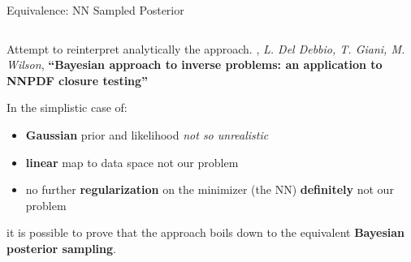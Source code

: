 \documentclass[9pt]{beamer}
\begin{document}
\begin{frame}{Equivalence: NN Sampled Posterior}
    \vspace*{15pt}

    \begin{columns}
        \begin{column}{0.5\textwidth}
            \vspace*{10pt}
            Attempt to reinterpret analytically the \nnpdf{} approach.\newline
            {\footnotesize
                , \textit{L. Del Debbio, T. Giani, M. Wilson},
                \textbf{\enquote{Bayesian approach to inverse problems: an
                application to NNPDF closure testing}}
            }
            \vspace*{30pt}

            In the simplistic case of:
            \begin{itemize}
                \item \textbf{Gaussian} prior and likelihood {\footnotesize\itshape not so unrealistic}
                \item \textbf{linear} map to data space {\footnotesize not our problem}
                \item no further \textbf{regularization} on the minimizer (the NN)
                    {\footnotesize \textbf{definitely} not our problem}
            \end{itemize}
            it is possible to prove that the \nnpdf{} approach boils down to
            the equivalent \alert{\textbf{Bayesian posterior sampling}}.
            \vspace*{15pt}


\end{column}
\end{columns}
\end{frame}
\end{document}
